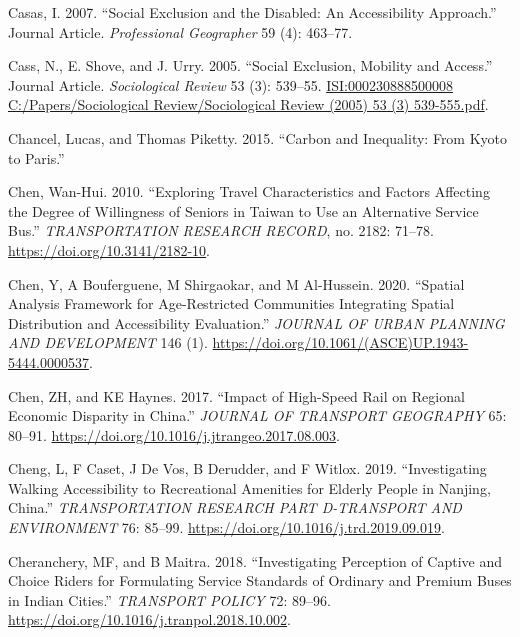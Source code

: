 \documentclass[12pt, oneside]{report}
\newlength{\cslhangindent}
\newlength{\cslentryspacingunit} %
\newenvironment{CSLReferences}[2] %
 {%
  \setlength{\parindent}{0pt}
  \ifodd #1
  \let\oldpar\par
  \def\par{\hangindent=\cslhangindent\oldpar}
  \fi
  \setlength{\parskip}{#2\cslentryspacingunit}
 }%
 {}
\begin{document}
\begin{CSLReferences}{1}{0}
\leavevmode{}%
Casas, I. 2007. {``Social Exclusion and the Disabled: An Accessibility
Approach.''} Journal Article. \emph{Professional Geographer} 59 (4):
463--77.

\leavevmode{}%
Cass, N., E. Shove, and J. Urry. 2005. {``Social Exclusion, Mobility and
Access.''} Journal Article. \emph{Sociological Review} 53 (3): 539--55.
\href{https://ISI:000230888500008\%0AC:/Papers/Sociological\%20Review/Sociological\%20Review\%20(2005)\%2053\%20(3)\%20539-555.pdf}{ISI:000230888500008
C:/Papers/Sociological Review/Sociological Review (2005) 53 (3)
539-555.pdf}.

\leavevmode{}%
Chancel, Lucas, and Thomas Piketty. 2015. {``Carbon and Inequality: From
Kyoto to Paris.''}

\leavevmode{}%
Chen, Wan-Hui. 2010. {``Exploring Travel Characteristics and Factors
Affecting the Degree of Willingness of Seniors in Taiwan to Use an
Alternative Service Bus.''} \emph{{TRANSPORTATION} {RESEARCH} {RECORD}},
no. 2182: 71--78. \url{https://doi.org/10.3141/2182-10}.

\leavevmode{}%
Chen, Y, A Bouferguene, M Shirgaokar, and M Al-Hussein. 2020. {``Spatial
{Analysis Framework} for {Age-Restricted Communities Integrating Spatial
Distribution} and {Accessibility Evaluation}.''} \emph{JOURNAL OF URBAN
PLANNING AND DEVELOPMENT} 146 (1).
\url{https://doi.org/10.1061/(ASCE)UP.1943-5444.0000537}.

\leavevmode{}%
Chen, ZH, and KE Haynes. 2017. {``Impact of High-Speed Rail on Regional
Economic Disparity in {China}.''} \emph{JOURNAL OF TRANSPORT GEOGRAPHY}
65: 80--91. \url{https://doi.org/10.1016/j.jtrangeo.2017.08.003}.

\leavevmode{}%
Cheng, L, F Caset, J De Vos, B Derudder, and F Witlox. 2019.
{``Investigating Walking Accessibility to Recreational Amenities for
Elderly People in {Nanjing}, {China}.''} \emph{TRANSPORTATION RESEARCH
PART D-TRANSPORT AND ENVIRONMENT} 76: 85--99.
\url{https://doi.org/10.1016/j.trd.2019.09.019}.

\leavevmode{}%
Cheranchery, MF, and B Maitra. 2018. {``Investigating Perception of
Captive and Choice Riders for Formulating Service Standards of Ordinary
and Premium Buses in {Indian} Cities.''} \emph{TRANSPORT POLICY} 72:
89--96. \url{https://doi.org/10.1016/j.tranpol.2018.10.002}.


\end{CSLReferences}
\end{document}
